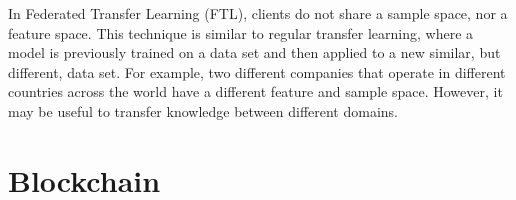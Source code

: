 In Federated Transfer Learning (FTL), clients do not share a sample space, nor a feature space. This technique is similar to regular transfer learning, where a model is previously trained on a data set and then applied to a new similar, but different, data set. For example, two different companies that operate in different countries across the world have a different feature and sample space. However, it may be useful to transfer knowledge between different domains.

\section{Blockchain}
\label{preliminaries:blockchain}



\cite{nakamoto2009bitcoin}

